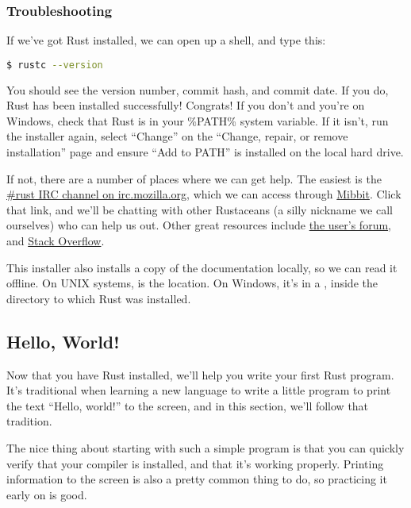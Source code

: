 \subsubsection*{Troubleshooting}

If we've got Rust installed, we can open up a shell, and type this:
\begin{lstlisting}[language=Bash]
$ rustc --version
\end{lstlisting}

You should see the version number, commit hash, and commit date.
\blank
If you do, Rust has been installed successfully! Congrats!
\blank
If you don't and you're on Windows, check that Rust is in your \%PATH\% system variable. If it isn't, run the installer again, 
select \enquote{Change} on the \enquote{Change, repair, or remove installation} page and ensure \enquote{Add to PATH} is installed 
on the local hard drive.

If not, there are a number of places where we can get help. The easiest is the 
\href{irc://irc.mozilla.org/\#rust}{\#rust IRC channel on irc.mozilla.org}, which we can access through
\href{http://chat.mibbit.com/?server=irc.mozilla.org&channel=\%23rust}{Mibbit}. Click that link, and we'll be chatting with other 
Rustaceans (a silly nickname we call ourselves) who can help us out. Other great resources include 
\href{https://users.rust-lang.org/}{the user’s forum}, and \href{http://stackoverflow.com/questions/tagged/rust}{Stack Overflow}.

This installer also installs a copy of the documentation locally, so we can read it offline. On UNIX systems,  
is the location. On Windows, it's in a , inside the directory to which Rust was installed.

\subsection{Hello, World!}

Now that you have Rust installed, we'll help you write your first Rust program. It's traditional when learning a new language to write 
a little program to print the text \enquote{Hello, world!} to the screen, and in this section, we'll follow that tradition.

\blank
The nice thing about starting with such a simple program is that you can quickly verify that your compiler is installed, and that it's 
working properly. Printing information to the screen is also a pretty common thing to do, so practicing it early on is good.


